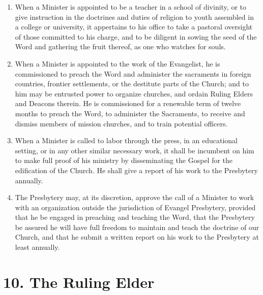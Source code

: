 \documentclass[
]{book}
\begin{document}
\begin{enumerate}
\item
  When a Minister is appointed to be a teacher in a school of divinity, or to give instruction in the doctrines and duties of religion to youth assembled in a college or university, it appertains to his office to take a pastoral oversight of those committed to his charge, and to be diligent in sowing the seed of the Word and gathering the fruit thereof, as one who watches for souls.
\item
  \protect\hypertarget{9.6}{\href{}{}}When a Minister is appointed to the work of the Evangelist, he is commissioned to preach the Word and administer the sacraments in foreign countries, frontier settlements, or the destitute parts of the Church; and to him may be entrusted power to organize churches, and ordain Ruling Elders and Deacons therein. He is commissioned for a renewable term of twelve months to preach the Word, to administer the Sacraments, to receive and dismiss members of mission churches, and to train potential officers.
\item
  When a Minister is called to labor through the press, in an educational setting, or in any other similar necessary work, it shall be incumbent on him to make full proof of his ministry by disseminating the Gospel for the edification of the Church. He shall give a report of his work to the Presbytery annually.
\item
  The Presbytery may, at its discretion, approve the call of a Minister to work with an organization outside the jurisdiction of Evangel Presbytery, provided that he be engaged in preaching and teaching the Word, that the Presbytery be assured he will have full freedom to maintain and teach the doctrine of our Church, and that he submit a written report on his work to the Presbytery at least annually.
\end{enumerate}

\hypertarget{the-ruling-elder}{%
\section*{10. The Ruling Elder}\label{the-ruling-elder}}

\protect\hypertarget{chapter-slug-10-the-ruling-elder}{\href{}{}}
\end{document}
